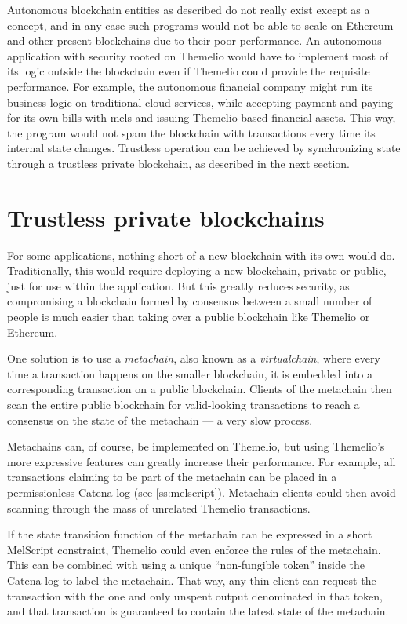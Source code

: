 \documentclass[headinclude,12pt]{scrbook}
\begin{document}
Autonomous blockchain entities as described do not really exist except as a concept, and in any case such programs would not be able to scale on Ethereum and other present blockchains due to their poor performance. An autonomous application with security rooted on Themelio would have to implement most of its logic outside the blockchain even if Themelio could provide the requisite performance. For example, the autonomous financial company might run its business logic on traditional cloud services, while accepting payment and paying for its own bills with mels and issuing Themelio-based financial assets. This way, the program would not spam the blockchain with transactions every time its internal state changes. Trustless operation can be achieved by synchronizing state through a trustless private blockchain, as described in the next section.

\section{Trustless private blockchains}

For some applications, nothing short of a new blockchain with its own would do. Traditionally, this would require deploying a new blockchain, private or public, just for use within the application. But this greatly reduces security, as compromising a blockchain formed by consensus between a small number of people is much easier than taking over a public blockchain like Themelio or Ethereum.

One solution is to use a \emph{metachain}, also known as a \emph{virtualchain}, where every time a transaction happens on the smaller blockchain, it is embedded into a corresponding transaction on a public blockchain. Clients of the metachain then scan the entire public blockchain for valid-looking transactions to reach a consensus on the state of the metachain --- a very slow process.

Metachains can, of course, be implemented on Themelio, but using Themelio's more expressive features can greatly increase their performance. For example, all transactions claiming to be part of the metachain can be placed in a permissionless Catena log (see \ref{ss:melscript}). Metachain clients could then avoid scanning through the mass of unrelated Themelio transactions.

If the state transition function of the metachain can be expressed in a short MelScript constraint, Themelio could even enforce the rules of the metachain. This can be combined with using a unique ``non-fungible token'' inside the Catena log to label the metachain. That way, any thin client can request the transaction with the one and only unspent output denominated in that token, and that transaction is guaranteed to contain the latest state of the metachain.
\end{document}
